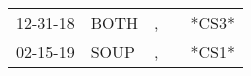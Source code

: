 \begin{supertabular}{lllll}
 12-31-18 &  BOTH &  , &   &  *CS3* \\
 02-15-19 &  SOUP &  , &   &  *CS1* \\
\end{supertabular}
